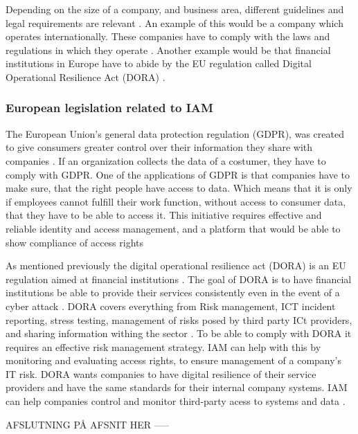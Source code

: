  Depending on the size of a company, and business area, different guidelines and legal requirements are relevant \cite{2024compliance?}. An example of this would be a company which operates internationally. These companies have to comply with the laws and regulations in which they operate \citep{2024compliance?}. Another example would be that financial institutions in Europe have to abide by the EU regulation called Digital Operational Resilience Act (DORA) \citep{Dora}.


 \subsubsection{European legislation related to IAM}
 The European Union's general data protection regulation (GDPR), was created to give consumers greater control over their information they share with companies \citep{IAM-gdpr:}. If an organization collects the data of a costumer, they have to comply with GDPR. One of the applications of GDPR is that companies have to make sure, that the right people have access to data. Which means that it is only if employees cannot fulfill their work function, without access to consumer data, that they have to be able to access it. This initiative requires effective and reliable identity and access management, and a platform that would be able to show compliance of access rights \citep{IAM-gdpr:}

 As mentioned previously the digital operational resilience act (DORA) is an EU regulation aimed at financial institutions \citep{DoraIAM:}. The goal of DORA is to have financial institutions be able to provide their services consistently even in the event of a cyber attack \citep{DoraIAM:}. DORA covers everything from Risk management, ICT incident reporting, stress testing, management of risks posed by third party ICt providers, and sharing information withing the sector \citep{Dora}. To be able to comply with DORA it requires an effective risk management strategy. IAM can help with this by monitoring and evaluating access rights, to ensure management of a company's IT risk. DORA wants companies to have digital resilience of their service providers and have the same standards for their internal company systems. IAM can help companies control and monitor third-party acess to systems and data \citep{DoraIAM:}.




 AFSLUTNING PÅ AFSNIT HER -----
